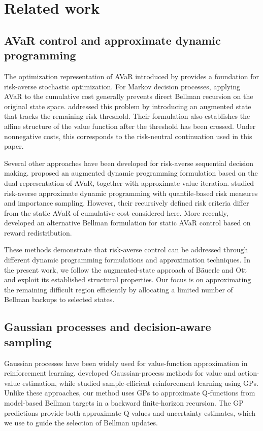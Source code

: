\section{Related work}
\label{sec:related}

\subsection{AVaR control and approximate dynamic programming}
\label{rel:avar-mdp}

The optimization representation of AVaR introduced by \cite{rockafellar-2002} provides a foundation for risk-averse stochastic optimization. For Markov decision processes, applying AVaR to the cumulative cost generally prevents direct Bellman recursion on the original state space. \cite{bauerle-2011} addressed this problem by introducing an augmented state that tracks the remaining risk threshold. Their formulation also establishes the affine structure of the value function after the threshold has been crossed. Under nonnegative costs, this corresponds to the risk-neutral continuation used in this paper.

Several other approaches have been developed for risk-averse sequential decision making. \cite{chow-2015} proposed an augmented dynamic programming formulation based on the dual representation of AVaR, together with approximate value iteration. \cite{jiang-2018} studied risk-averse approximate dynamic programming with quantile-based risk measures and importance sampling. However, their recursively defined risk criteria differ from the static AVaR of cumulative cost considered here. More recently, \cite{muni-2026} developed an alternative Bellman formulation for static AVaR control based on reward redistribution.

These methods demonstrate that risk-averse control can be addressed through different dynamic programming formulations and approximation techniques. In the present work, we follow the augmented-state approach of B\"{a}uerle and Ott and exploit its established structural properties. Our focus is on approximating the remaining difficult region efficiently by allocating a limited number of Bellman backups to selected states.

\subsection{Gaussian processes and decision-aware sampling}
\label{rel:gp}

Gaussian processes have been widely used for value-function approximation in reinforcement learning. \cite{engel-2005} developed Gaussian-process methods for value and action-value estimation, while \cite{grande-2014} studied sample-efficient reinforcement learning using GPs. Unlike these approaches, our method uses GPs to approximate Q-functions from model-based Bellman targets in a backward finite-horizon recursion. The GP predictions provide both approximate Q-values and uncertainty estimates, which we use to guide the selection of Bellman updates.


